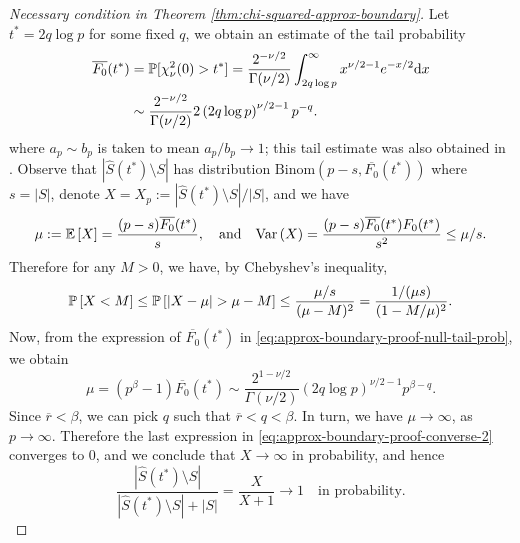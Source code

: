 \begin{proof}[Necessary condition in Theorem \ref{thm:chi-squared-approx-boundary}]
Let $t^* = 2q\log{p}$ for some fixed $q$, we obtain an estimate of the tail probability
\begin{align}
    \overline{F_0}(t^*) 
    &= \P[\chi_\nu^2(0) > t^*] 
    = \frac{2^{-\nu/2}}{\Gamma(\nu/2)} \int_{2q\log{p}}^\infty x^{\nu/2-1}e^{-x/2} \mathrm{d}x \nonumber \\
    &\sim \frac{2^{-\nu/2}}{\Gamma(\nu/2)} 2\left(2q\log{p}\right)^{\nu/2-1}p^{-q}. \label{eq:approx-boundary-proof-null-tail-prob}
\end{align}
where $a_p\sim b_p$ is taken to mean $a_p/b_p\to 1$; this tail estimate was also obtained in \cite{donoho2004higher}.
Observe that $|\widehat{S}(t^*)\setminus{S}|$ has distribution $\text{Binom}(p-s, \overline{F_0}(t^*))$ where $s=|S|$, denote $X = X_p := {|\widehat{S}(t^*)\setminus{S}|}/{|S|}$, and we have 
$$
\mu := \E\left[X\right] = \frac{(p-s)\overline{F_0}(t^*)}{s},
\quad \text{and} \quad
\var\left(X\right) = \frac{(p-s)\overline{F_0}(t^*){F_0}(t^*)}{s^2} \le \mu/s.
$$
Therefore for any $M>0$, we have, by Chebyshev's inequality,
\begin{equation}
    \P\left[X < M\right] 
    \le \P\left[\left|X-\mu\right| > \mu - M\right]
    \le \frac{\mu/s}{(\mu-M)^2}
    = \frac{1/(\mu s)}{(1-M/\mu)^2}. \label{eq:approx-boundary-proof-converse-2}
\end{equation}
Now, from the expression of $\overline{F_0}(t^*)$ in \eqref{eq:approx-boundary-proof-null-tail-prob}, we obtain
$$
\mu = (p^\beta - 1)\overline{F_0}(t^*) \sim \frac{2^{1-\nu/2}}{\Gamma(\nu/2)} \left(2q\log{p}\right)^{\nu/2-1}p^{\beta-q}.
$$
Since $\overline{r}<\beta$, we can pick $q$ such that $\overline{r}<q<\beta$. 
In turn, we have $\mu \to\infty$, as $p\to\infty$.
Therefore the last expression in \eqref{eq:approx-boundary-proof-converse-2} converges to 0, and we conclude that $X\to\infty$ in probability, and hence
\begin{equation} \label{eq:approx-boundary-proof-converse-3}
\frac{|\widehat{S}(t^*)\setminus{S}|}{|\widehat{S}(t^*)\setminus{S}|+|{S}|} 
= \frac{X}{X+1} \to 1 \quad \text{in probability}.
\end{equation}


\end{proof}
